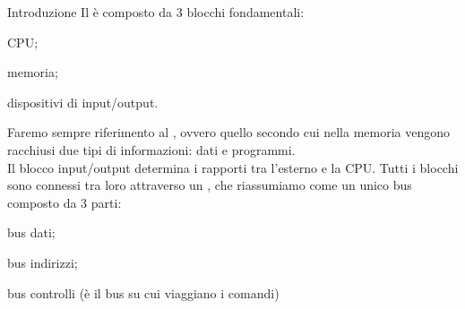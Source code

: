 \documentclass[9pt]{extarticle}
\begin{document}
	\begin{myDocument}{Introduzione}
Il  è composto da 3 blocchi fondamentali:
		\begin{bullist} 
			\item CPU;
			\item memoria;
			\item dispositivi di input/output.
		\end{bullist}
Faremo sempre riferimento al , ovvero quello secondo cui nella memoria vengono racchiusi due tipi di informazioni: dati e programmi. \\
Il blocco input/output determina i rapporti tra l'esterno e la CPU. Tutti i blocchi sono connessi tra loro attraverso un , che riassumiamo come un unico bus composto da 3 parti:
		\begin{bullist}
			\item bus dati;
			\item bus indirizzi;
			\item bus controlli (è il bus su cui viaggiano i comandi)
		\end{bullist}
		\begin{multimage}{2}
		\end{multimage}

















	\end{myDocument}
\end{document}
